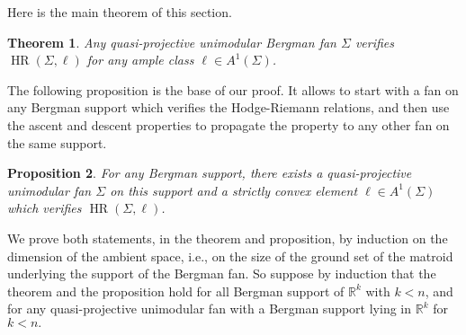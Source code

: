 \documentclass[11pt]{amsart}
\newtheorem{thm}{Theorem}[section]
\newtheorem{prop}[thm]{Proposition}
\theoremstyle{definition}
\numberwithin{equation}{section}
\renewcommand{\~}{\widetilde}
\newcommand{\R}{\mathbb{R}}
\DeclareMathOperator{\HR}{HR} %
\begin{document}
Here is the main theorem of this section.

\begin{thm}\label{thm:mainlocal} Any quasi-projective unimodular Bergman fan $\Sigma$ verifies $\HR(\Sigma, \ell)$ for any ample class $\ell \in A^1(\Sigma)$.
\end{thm}

The following proposition is the base of our proof. It allows to start with a fan on any Bergman support which verifies the Hodge-Riemann relations, and then use the ascent and descent properties to propagate the property to any other fan on the same support.

\begin{prop}\label{prop:baseHR}
For any Bergman support, there exists a quasi-projective unimodular fan $\Sigma$ on this support and a strictly convex element $\ell \in A^1(\Sigma)$ which verifies $\HR(\Sigma, \ell)$.
\end{prop}

We prove both statements, in the theorem and proposition, by induction on the dimension of the ambient space, i.e., on the size of the ground set of the matroid underlying the support of the Bergman fan.
So suppose by induction that the theorem and the proposition hold for all Bergman support of $\R^k$ with $k<n$, and for any quasi-projective unimodular fan with a Bergman support lying in $\R^k$ for $k<n.$
\end{document}
